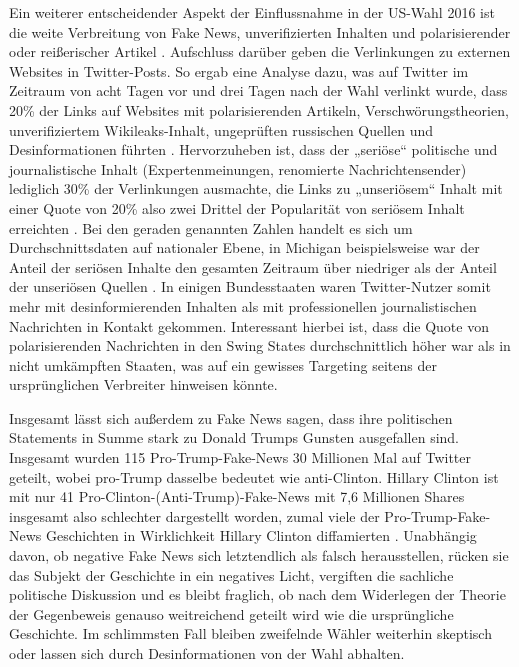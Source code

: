 Ein weiterer entscheidender Aspekt der Einflussnahme in der US-Wahl 2016 ist die weite Verbreitung von Fake News, unverifizierten Inhalten und polarisierender oder reißerischer Artikel \autocite[vgl.][]{howard2018social}. Aufschluss darüber geben die Verlinkungen zu externen Websites in Twitter-Posts.  So ergab eine Analyse dazu, was auf Twitter im Zeitraum von acht Tagen vor und drei Tagen nach der Wahl verlinkt wurde, dass 20\% der Links auf Websites mit polarisierenden Artikeln, Verschwörungstheorien, unverifiziertem Wikileaks-Inhalt, ungeprüften russischen Quellen und Desinformationen führten \autocite[vgl.][3]{howard2018social}. Hervorzuheben ist, dass der „seriöse“ politische und journalistische Inhalt (Expertenmeinungen, renomierte Nachrichtensender) lediglich 30\% der Verlinkungen ausmachte, die Links zu „unseriösem“ Inhalt mit einer Quote von 20\% also zwei Drittel der Popularität von seriösem Inhalt erreichten \autocite[vgl.][3]{howard2018social}. Bei den geraden genannten Zahlen handelt es sich um Durchschnittsdaten auf nationaler Ebene, in Michigan beispielsweise war der Anteil der seriösen Inhalte den gesamten Zeitraum über niedriger als der Anteil der unseriösen Quellen \autocite[vgl.][3]{howard2018social}. In einigen Bundesstaaten waren Twitter-Nutzer somit mehr mit desinformierenden Inhalten als mit professionellen journalistischen Nachrichten in Kontakt gekommen. Interessant hierbei ist, dass die Quote von polarisierenden Nachrichten in den Swing States durchschnittlich höher war als in nicht umkämpften Staaten, was auf ein gewisses Targeting seitens der ursprünglichen Verbreiter hinweisen könnte.

Insgesamt lässt sich außerdem zu \glqq Fake News\grqq{} sagen, dass ihre politischen Statements in Summe stark zu Donald Trumps Gunsten ausgefallen sind. Insgesamt wurden 115 Pro-Trump-Fake-News 30 Millionen Mal auf Twitter geteilt, wobei pro-Trump dasselbe bedeutet wie anti-Clinton. Hillary Clinton ist mit nur 41 Pro-Clinton-(Anti-Trump)-Fake-News mit 7,6 Millionen Shares insgesamt also schlechter dargestellt worden, zumal viele der Pro-Trump-Fake-News Geschichten in Wirklichkeit Hillary Clinton diffamierten \autocite[vgl.][212 \psqq]{allcott2017social}. Unabhängig davon, ob negative Fake News sich letztendlich als falsch herausstellen, rücken sie das Subjekt der Geschichte in ein negatives Licht, vergiften die sachliche politische Diskussion und es bleibt fraglich, ob nach dem Widerlegen der Theorie der Gegenbeweis genauso weitreichend geteilt wird wie die ursprüngliche Geschichte. Im schlimmsten Fall bleiben zweifelnde Wähler weiterhin skeptisch oder lassen sich durch Desinformationen von der Wahl abhalten. 

